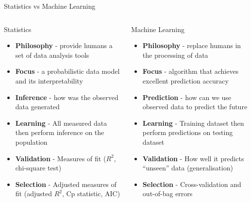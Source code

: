 \documentclass[pdf]{beamer}
\begin{document}
\begin{frame}{Statistics vs Machine Learning}
\footnotesize %
\begin{columns}
\begin{block}{Statistics}
	\begin{itemize}\addtolength{\itemsep}{0.6\baselineskip}
		\item<2-> \textbf{Philosophy} - provide humans a set of data analysis tools 
		\item<3-> \textbf{Focus} - a probabilistic data model and its interpretability
		\item<4-> \textbf{Inference} - how was the observed data generated
		\item<5-> \textbf{Learning} - All measured data then perform inference on the population
		\item<6-> \textbf{Validation} - Measures of fit ($R^2$, chi-square test)
		\item<7-> \textbf{Selection} - Adjusted measures of fit (adjusted $R^2$, Cp statistic, AIC)
	\end{itemize}
\end{block}
\begin{block}{Machine Learning}
	\begin{itemize}\addtolength{\itemsep}{0.6\baselineskip}
		\item<2-> \textbf{Philosophy} - replace humans in the processing of data  
		\item<3-> \textbf{Focus} - algorithm that achieves excellent prediction accuracy
		\item<4-> \textbf{Prediction} - how can we use observed data to predict the future
		\item<5-> \textbf{Learning} - Training dataset then perform predictions on testing dataset
		\item<6-> \textbf{Validation} - How well it predicts ``unseen'' data (generalisation)
		\item<7-> \textbf{Selection} - Cross-validation and out-of-bag errors
	\end{itemize}
\end{block}
\end{columns}
\end{frame}
\normalsize
\end{document}
